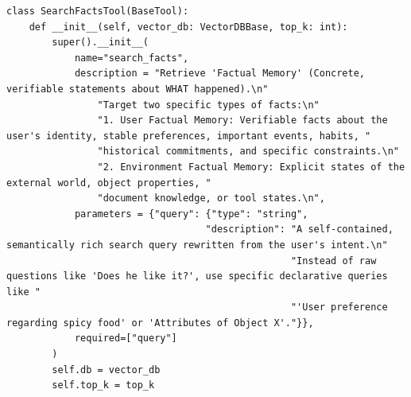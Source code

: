 \documentclass[11pt, a4paper]{lumia}
\begin{document}
\begin{tcolorbox}[title={SearchFactsTool}, sharp corners, breakable, 
      colframe=Periwinkle, colback=white, 
        boxrule=3pt, boxsep=0.5pt, enhanced, 
        shadow={3pt}{-3pt}{0pt}{opacity=1}]
        \footnotesize
        {\selectfont
\begin{lstlisting}[breaklines=true,showstringspaces=false]
class SearchFactsTool(BaseTool):
    def __init__(self, vector_db: VectorDBBase, top_k: int):
        super().__init__(
            name="search_facts",
            description = "Retrieve 'Factual Memory' (Concrete, verifiable statements about WHAT happened).\n"
                "Target two specific types of facts:\n"
                "1. User Factual Memory: Verifiable facts about the user's identity, stable preferences, important events, habits, "
                "historical commitments, and specific constraints.\n"
                "2. Environment Factual Memory: Explicit states of the external world, object properties, "
                "document knowledge, or tool states.\n",
            parameters = {"query": {"type": "string",
                                   "description": "A self-contained, semantically rich search query rewritten from the user's intent.\n"
                                                  "Instead of raw questions like 'Does he like it?', use specific declarative queries like "
                                                  "'User preference regarding spicy food' or 'Attributes of Object X'."}},
            required=["query"]
        )
        self.db = vector_db
        self.top_k = top_k
\end{lstlisting}
}
\end{tcolorbox}
\end{document}
